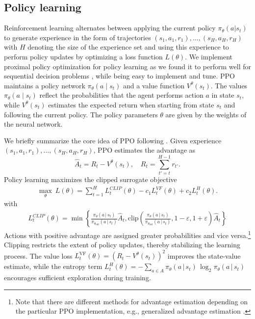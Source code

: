 \documentclass[11pt]{elsarticle}
\begin{document}
\subsection{Policy learning}
 
Reinforcement learning alternates between applying the current policy $\pi_\theta(a|s_t)$ to generate experience in the form of trajectories $(s_1, a_1, r_1),\dots, (s_{H},a_{H},r_{H})$ with $H$ denoting the size of the experience set and using this experience to perform policy updates by optimizing a loss function $L(\theta)$. 
We implement proximal policy optimization \citep[PPO,][]{schulman_proximal_2017} for policy learning as we found it to perform well for sequential decision problems \citep{Brammer.2022a,Brammer.2022b,Brammer.2021}, while being easy to implement and tune. PPO maintains a policy network $\pi_\theta(a \mid s_t)$ and a value function $V^\theta(s_t)$. The values $\pi_\theta(a \mid s_t)$ reflect the probabilities that the agent performs action $a$ in state $s_t$, while $V^\theta(s_t)$ estimates the expected return when starting from state $s_t$ and following the current policy. 
The policy parameters $\theta$ are given by the weights of the neural network. 



We briefly summarize the core idea of PPO following \citet{schulman_proximal_2017}. 
Given experience $(s_1, a_1, r_1),\dots, (s_{H},a_{H},r_{H})$, PPO estimates the advantage as
\begin{equation}
\hat{A}_t = R_t - V^\theta(s_t), \quad R_t=\sum_{t'=t}^{H-1} r_{t'} .
\end{equation}
Policy learning maximizes the clipped surrogate objective
\begin{align}
\max_\theta\ L(\theta) = \sum\limits_{t=1}^{H} L_t^{CLIP}(\theta) - c_1 L_t^{VF}(\theta) + c_2 L_t^H(\theta).
\label{eqn:ppo_loss} 
\end{align}
with
\begin{align}
L_t^{CLIP}(\theta) = \min \left\lbrace \frac{\pi_\theta(a\,|\,s_t)}{\pi_{\theta_\mathrm{old}}(a\,|\,s_t)} \hat{A}_t, \text{clip} \left(\frac{\pi_\theta(a\,|\,s_t)}{\pi_{\theta_\mathrm{old}}(a\,|\,s_t)}, 1-\varepsilon, 1+ \varepsilon \right) \hat{A}_t \right\rbrace
\label{eqn:fraction_pi} 
\end{align}
Actions with positive advantage are assigned greater probabilities and vice versa.\footnote{Note that there are different methods for advantage estimation depending on the particular PPO implementation, e.g., generalized advantage estimation \citep{schulman_high-dimensional_2015}.} 
Clipping restricts the extent of policy updates, thereby stabilizing the learning process. 
The value loss $L_t^{\text{VF}}(\theta)=(R_t - V^\theta(s_t))^2$ improves the state-value estimate, while the entropy term
$L_t^{H}(\theta)= -\sum_{a\in A} \pi_\theta(a \,|\,s_t)\,\log_2 \pi_\theta(a\,|\,s_t)$ 
encourages sufficient exploration during training.
\end{document}
